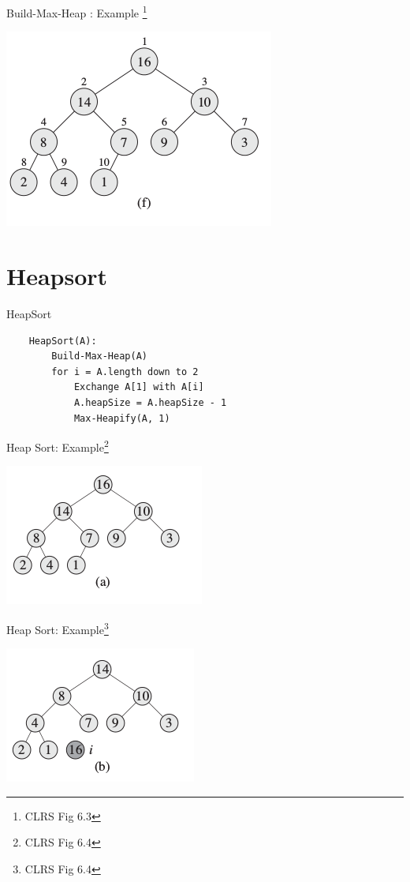 \documentclass{beamer}
\begin{document}
\begin{frame}{Build-Max-Heap : Example \footnote{CLRS Fig 6.3}}
    \begin{center}
        \includegraphics[scale=0.5]{buildMaxHeap6.png}
    \end{center}
\end{frame}


\section{Heapsort}
\begin{frame}[fragile]{HeapSort}
    \begin{verbatim}
    HeapSort(A):
        Build-Max-Heap(A)
        for i = A.length down to 2
            Exchange A[1] with A[i]
            A.heapSize = A.heapSize - 1
            Max-Heapify(A, 1)
    \end{verbatim}
\end{frame}


\begin{frame}{Heap Sort: Example\footnote{CLRS Fig 6.4}}
    \begin{center}
        \includegraphics[scale=0.7]{heapSort1.png}
    \end{center}
\end{frame}


\begin{frame}{Heap Sort: Example\footnote{CLRS Fig 6.4}}
    \begin{center}
        \includegraphics[scale=0.7]{heapSort2.png}
    \end{center}
\end{frame}
\end{document}
